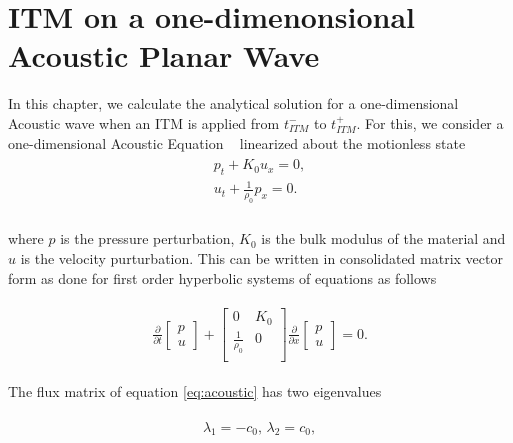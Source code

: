 
\section{\ac{ITM} on a one-dimenonsional Acoustic Planar Wave}\label{section:ITMAcoustic}
In this chapter, we calculate the analytical solution for a one-dimensional Acoustic wave when an \ac{ITM} is applied from $t_{ITM}^-$ to $t_{ITM}^+$.
For this, we consider a one-dimensional Acoustic Equation ~\parencite[Sec. 2.8]{leveque_2002} linearized about the motionless state
\begin{align}
    \begin{split}
        p_t + K_0u_x = 0, \\
        u_t + \frac{1}{\rho_0}p_x = 0 .\\
    \end{split}
\end{align}

where $p$ is the pressure perturbation, $K_0$ is the bulk modulus of the material and $u$ is the velocity purturbation. 
This can be written in consolidated matrix vector form as done for first order hyperbolic systems of equations as follows

\begin{align}
    \begin{split}
        \frac{\partial }{\partial t}
    \begin{bmatrix}
        p \\
        u
    \end{bmatrix} + 
    \begin{bmatrix}
        0 & K_0 \\
        \frac{1}{\rho_0} & 0 \\
    \end{bmatrix}
    \frac{\partial }{\partial x}
    \begin{bmatrix}
        p \\
        u
    \end{bmatrix} = 0 .
    \end{split}
    \label{eq:acoustic}
\end{align}

The flux matrix of equation \ref{eq:acoustic} has two eigenvalues

\begin{align}
    \begin{split}
        \lambda_1 = -c_0, \, \lambda_2 = c_0,
    \end{split}
\end{align}

